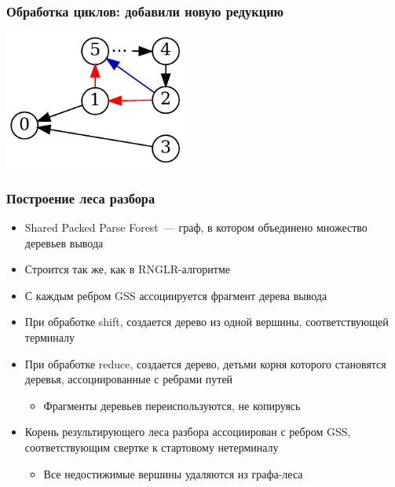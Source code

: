 \documentclass{beamer}
\begin{document}
\begin{frame}
  \transwipe[direction=90]
  \frametitle{Обработка циклов: добавили новую редукцию}
  \begin{center}                                
  \includegraphics[width=6cm]{pictures/gss_cycle/gss_cycle}
  \end{center}
\end{frame}

\begin{frame}
  \transwipe[direction=90]
  \frametitle{Построение леса разбора}
  \begin{itemize}
    \item Shared Packed Parse Forest~--- граф, в котором объединено множество 
деревьев вывода
    \item Строится так же, как в RNGLR-алгоритме
    \end{itemize}
    \begin{itemize}
      \item С каждым ребром GSS ассоциируется фрагмент дерева вывода
      \item При обработке shift, создается дерево из одной вершины, 
соответствующей терминалу
      \item При обработке reduce, создается дерево, детьми корня которого 
становятся деревья, ассоциированные с ребрами путей
      \begin{itemize}
        \item Фрагменты деревьев переиспользуются, не копируясь
      \end{itemize}
      \item Корень результирующего леса разбора ассоциирован с ребром GSS, 
соответствующим свертке к стартовому нетерминалу
      \begin{itemize}
        \item Все недостижимые вершины удаляются из графа-леса
      \end{itemize}
    \end{itemize}

\end{frame}
\end{document}
